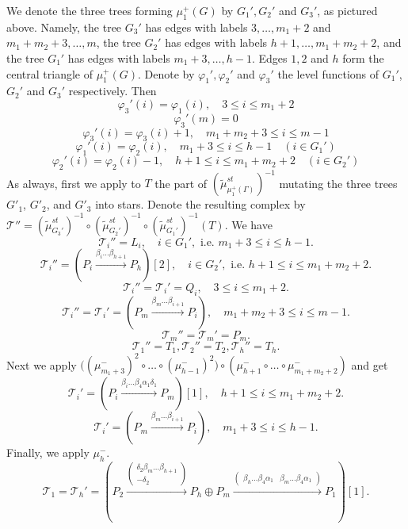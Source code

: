 \documentclass[12pt]{amsart}
\theoremstyle{plain}
\theoremstyle{remark}
\theoremstyle{definition}
\begin{document}
\begin{enumerate}
\begin{enumerate}
We denote the three trees forming $\mu_1^+(G)$ by $G_1', G_2'$ and $G_3'$, as pictured above. Namely, the tree $G_3'$ has edges with labels $3, \dots, m_1+2$ and $m_1+m_2+3, \dots, m$, the tree $G_2'$ has edges with labels $h+1, \dots, m_1+m_2+2$, and the tree $G_1'$ has edges with labels $m_1 + 3, \dots, h-1$. Edges $1, 2$ and $h$ form the central triangle of $\mu_1^+(G)$. Denote by $\varphi_1', \varphi_2'$ and $\varphi_3'$ the level functions of $G_1'$, $G_2'$ and $G_3'$ respectively. Then
     $$\varphi_3'(i) = \varphi_1(i), \quad 3 \leq i \leq m_1+2 $$
     $$\varphi_3'(m) = 0 $$
     $$\varphi_3'(i) = \varphi_3(i) + 1, \quad m_1+m_2+3 \leq i \leq m-1  $$
     $$ \varphi_1'(i) = \varphi_2(i), \quad m_1+3 \leq i \leq h-1 \quad (i \in G_1') $$
     $$ \varphi_2'(i) = \varphi_2(i)-1, \quad h+1 \leq i \leq m_1 +m_2 + 2 \quad (i \in G_2')  $$
As always, first we apply to $T$ the part of $(\widetilde{\mu}_{\mu_1^+(\Gamma)}^{st})^{-1}$ mutating the three trees $G'_1$, $G'_2$, and $G'_3$ into stars. Denote the resulting complex by $\mathcal{T}'' = (\widetilde{\mu}_{G_3'}^{st})^{-1} \circ(\widetilde{\mu}_{G_2'}^{st})^{-1} \circ (\widetilde{\mu}_{G_1'}^{st})^{-1}(T) $.
We have 
 $$\mathcal{T}_i'' = L_i, \quad i \in G_1', \text{ i.e. } m_1 + 3 \leq i \leq h-1. $$
   $$ \mathcal{T}_i'' = (P_i \xrightarrow{\beta_i \dots \beta_{h+1}} P_h)[2], \quad i \in G_2', \text{ i.e. } h+1 \leq i \leq m_1 + m_2 +2. $$
   $$ \mathcal{T}_i'' = \mathcal{T}_i' = Q_i, \quad 3 \leq i \leq m_1+2.$$
   $$ \mathcal{T}_i'' = \mathcal{T}_i' =  (P_{m} \xrightarrow{\beta_m \dots \beta_{i+1}} P_i), \quad m_1+m_2+3 \leq i \leq m-1.$$
   $$ \mathcal{T}_{m}'' = \mathcal{T}_m' = P_{m}.$$
   $$\mathcal{T}_1'' = T_1, \mathcal{T}_{2}'' = T_{2}, \mathcal{T}_h'' = T_h. $$
      Next we apply $\big((\mu_{m_1+3}^-)^2\circ \dots\circ (\mu_{h-1}^-)^2\big)\circ (\mu_{h+1}^- \circ \dots \circ \mu_{m_1+m_2+2}^-)$ and get 
    $$\mathcal{T}_i' = (P_i \xrightarrow{\beta_i \dots \beta_4 \alpha_1 \delta_1} P_{m})[1], \quad h+1 \leq i \leq m_1+m_2+2. $$  
        $$\mathcal{T}_i' = (P_{m} \xrightarrow{\beta_m \dots \beta_{i+1}} P_{i}), \quad m_1+3 \leq i \leq h-1.$$
    Finally, we apply $\mu_h^-$. 
    $$\mathcal{T}_1 = \mathcal{T}_h' = (P_2 \xrightarrow{ \begin{pmatrix} \delta_2\beta_m \dots \beta_{h+1} \\ -\delta_2 \end{pmatrix}} P_h \oplus P_m \xrightarrow{ \begin{pmatrix} \beta_h \dots \beta_4 \alpha_1 & \beta_m \dots \beta_4 \alpha_1 \end{pmatrix}} P_1)[1].$$

\end{enumerate}
\end{enumerate}
\end{document}
